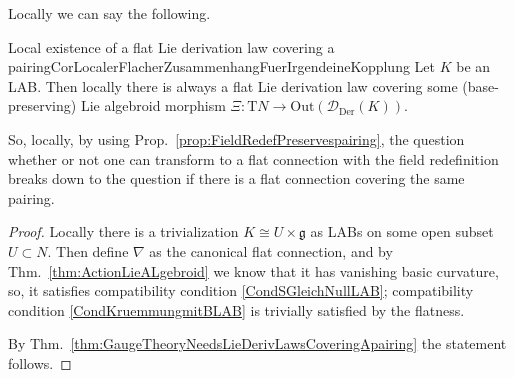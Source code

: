 
%

Locally we can say the following.

\begin{corollaries}{Local existence of a flat Lie derivation law covering a pairing}{CorLocalerFlacherZusammenhangFuerIrgendeineKopplung}
Let $K$ be an LAB. Then locally there is always a flat Lie derivation law covering some (base-preserving) Lie algebroid morphism $\Xi: \mathrm{T}N \to \mathrm{Out}(\mathcal{D}_{\mathrm{Der}}(K))$.
\end{corollaries}

\begin{remark}
\leavevmode\newline
So, locally, by using Prop.~\ref{prop:FieldRedefPreservespairing}, the question whether or not one can transform to a flat connection with the field redefinition breaks down to the question if there is a flat connection covering the same pairing.
\end{remark}

\begin{proof}
\leavevmode\newline
Locally there is a trivialization $K \cong U \times \mathfrak{g}$ as LABs on some open subset $U \subset N$. Then define $\nabla$ as the canonical flat connection, and by Thm.~\ref{thm:ActionLieALgebroid} we know that it has vanishing basic curvature, so, it satisfies compatibility condition \eqref{CondSGleichNullLAB}; compatibility condition \eqref{CondKruemmungmitBLAB} is trivially satisfied by the flatness.

By Thm.~\ref{thm:GaugeTheoryNeedsLieDerivLawsCoveringApairing} the statement follows.
\end{proof}

